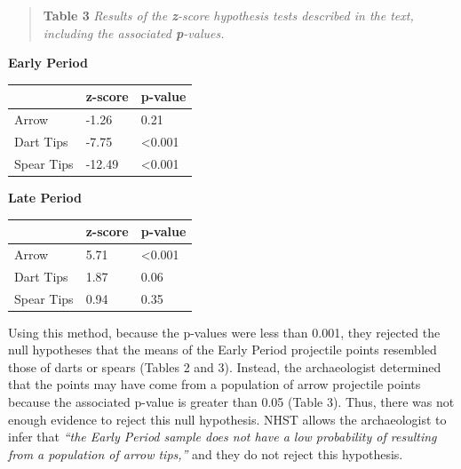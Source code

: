 \documentclass[
]{article}
\begin{document}
\newpage

\begin{quote}
\textbf{Table 3} \emph{Results of the \textbf{z}-score hypothesis tests
described in the text, including the associated \textbf{p}-values.}
\end{quote}

\textbf{Early Period}

\begin{longtable}[]{@{}lll@{}}
\toprule
& z-score & p-value \\
\midrule
\endhead
Arrow & -1.26 & 0.21 \\
Dart Tips & -7.75 & \textless0.001 \\
Spear Tips & -12.49 & \textless0.001 \\
\bottomrule
\end{longtable}

\textbf{Late Period}

\begin{longtable}[]{@{}lll@{}}
\toprule
& z-score & p-value \\
\midrule
\endhead
Arrow & 5.71 & \textless0.001 \\
Dart Tips & 1.87 & 0.06 \\
Spear Tips & 0.94 & 0.35 \\
\bottomrule
\end{longtable}

Using this method, because the p-values were less than 0.001, they
rejected the null hypotheses that the means of the Early Period
projectile points resembled those of darts or spears (Tables 2 and 3).
Instead, the archaeologist determined that the points may have come from
a population of arrow projectile points because the associated p-value
is greater than 0.05 (Table 3). Thus, there was not enough evidence to
reject this null hypothesis. NHST allows the archaeologist to infer that
\emph{``the Early Period sample does not have a low probability of
resulting from a population of arrow tips,''} and they do not reject
this hypothesis.
\end{document}
